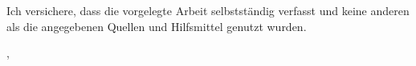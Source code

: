 
Ich versichere, dass die vorgelegte Arbeit selbstständig verfasst und keine anderen als die angegebenen Quellen und Hilfsmittel genutzt wurden.


\WritePlace{}, \DocDate{}\\
\,\hspace{1cm}\Author{} \\
